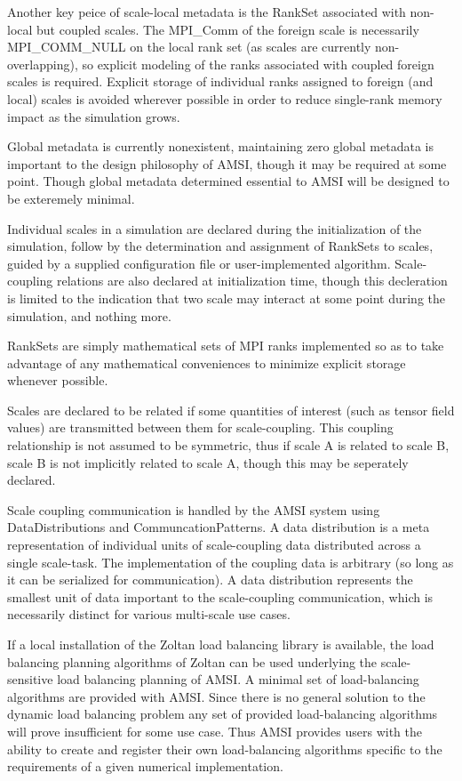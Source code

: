 \documentclass[11pt]{article}
\begin{document}
Another key peice of scale-local metadata is the RankSet associated with non-local but coupled scales. The MPI_Comm of the foreign scale is necessarily MPI_COMM_NULL on the local rank set (as scales are currently non-overlapping), so explicit modeling of the ranks associated with coupled foreign scales is required.  Explicit storage of individual ranks assigned to foreign (and local) scales is avoided wherever possible in order to reduce single-rank memory impact as the simulation grows. 

Global metadata is currently nonexistent, maintaining zero global metadata is important to the design philosophy of AMSI, though it may be required at some point. Though global metadata determined essential to AMSI will be designed to be exteremely minimal.

\label{amsi_scales}
Individual scales in a simulation are declared during the initialization of the simulation, follow by the determination and assignment of RankSets to scales, guided by a supplied configuration file or user-implemented algorithm. Scale-coupling relations are also declared at initialization time, though this decleration is limited to the indication that two scale may interact at some point during the simulation, and nothing more.

RankSets are simply mathematical sets of MPI ranks implemented so as to take advantage of any mathematical conveniences to minimize explicit storage whenever possible.

Scales are declared to be related if some quantities of interest (such as tensor field values) are transmitted between them for scale-coupling. This coupling relationship is not assumed to be symmetric, thus if scale A is related to scale B, scale B is not implicitly related to scale A, though this may be seperately declared.

\label{amsi_communication}
Scale coupling communication is handled by the AMSI system using DataDistributions and CommuncationPatterns. A data distribution is a meta representation of individual units of scale-coupling data distributed across a single scale-task. The implementation of the coupling data is arbitrary (so long as it can be serialized for communication). A data distribution represents the smallest unit of data important to the scale-coupling communication, which is necessarily distinct for various multi-scale use cases.

\label{amsi_data_migration_balancing}
If a local installation of the Zoltan \cite{ZoltanOverviewArticle2002} \cite{ZoltanIsorropiaOverview2012} load balancing library is available, the load balancing planning algorithms of Zoltan can be used underlying the scale-sensitive load balancing planning of AMSI. A minimal set of load-balancing algorithms are provided with AMSI. Since there is no general solution to the dynamic load balancing problem any set of provided load-balancing algorithms will prove insufficient for some use case. Thus AMSI provides users with the ability to create and register their own load-balancing algorithms specific to the requirements of a given numerical implementation.
\end{document}
